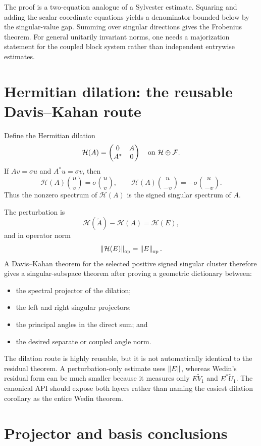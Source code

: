 The proof is a two-equation analogue of a Sylvester estimate. Squaring and adding the scalar coordinate equations yields a denominator bounded below by the singular-value gap. Summing over singular directions gives the Frobenius theorem. For general unitarily invariant norms, one needs a majorization statement for the coupled block system rather than independent entrywise estimates.

\section{Hermitian dilation: the reusable Davis--Kahan route}

Define the Hermitian dilation
\[
 \mathcal H(A)
 =
 \begin{pmatrix}
 0&A\\
 A^*&0
 \end{pmatrix}
 \quad\text{on }\mathcal{H}\oplus\mathcal{F}.
\]
If $Av=\sigma u$ and $A^*u=\sigma v$, then
\[
 \mathcal H(A)\binom{u}{v}=\sigma\binom{u}{v},
 \qquad
 \mathcal H(A)\binom{u}{-v}=-\sigma\binom{u}{-v}.
\]
Thus the nonzero spectrum of $\mathcal H(A)$ is the signed singular spectrum of $A$.

The perturbation is
\[
 \mathcal H(\widetilde A)-\mathcal H(A)
 =\mathcal H(E),
\]
and in operator norm
\[
 \left\lVert \mathcal H(E)\right\rVert_{\mathrm{op}}=\left\lVert E\right\rVert_{\mathrm{op}}.
\]
A Davis--Kahan theorem for the selected positive signed singular cluster therefore gives a singular-subspace theorem after proving a geometric dictionary between:
\begin{itemize}[leftmargin=2em]
\item the spectral projector of the dilation;
\item the left and right singular projectors;
\item the principal angles in the direct sum; and
\item the desired separate or coupled angle norm.
\end{itemize}

The dilation route is highly reusable, but it is not automatically identical to the residual theorem. A perturbation-only estimate uses $\left\lVert E\right\rVert$, whereas Wedin's residual form can be much smaller because it measures only $E\widetilde V_1$ and $E^*\widetilde U_1$. The canonical API should expose both layers rather than naming the easiest dilation corollary as the entire Wedin theorem.

\section{Projector and basis conclusions}

